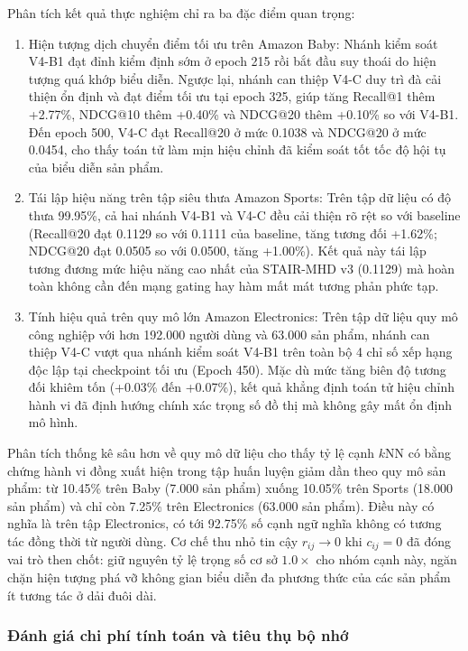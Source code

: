 Phân tích kết quả thực nghiệm chỉ ra ba đặc điểm quan trọng:
\begin{enumerate}[leftmargin=*]
    \item Hiện tượng dịch chuyển điểm tối ưu trên Amazon Baby: Nhánh kiểm soát V4-B1 đạt đỉnh kiểm định sớm ở epoch 215 rồi bắt đầu suy thoái do hiện tượng quá khớp biểu diễn. Ngược lại, nhánh can thiệp V4-C duy trì đà cải thiện ổn định và đạt điểm tối ưu tại epoch 325, giúp tăng Recall@1 thêm +2.77\%, NDCG@10 thêm +0.40\% và NDCG@20 thêm +0.10\% so với V4-B1. Đến epoch 500, V4-C đạt Recall@20 ở mức 0.1038 và NDCG@20 ở mức 0.0454, cho thấy toán tử làm mịn hiệu chỉnh đã kiểm soát tốt tốc độ hội tụ của biểu diễn sản phẩm.
    \item Tái lập hiệu năng trên tập siêu thưa Amazon Sports: Trên tập dữ liệu có độ thưa 99.95\%, cả hai nhánh V4-B1 và V4-C đều cải thiện rõ rệt so với baseline (Recall@20 đạt 0.1129 so với 0.1111 của baseline, tăng tương đối +1.62\%; NDCG@20 đạt 0.0505 so với 0.0500, tăng +1.00\%). Kết quả này tái lập tương đương mức hiệu năng cao nhất của STAIR-MHD v3 (0.1129) mà hoàn toàn không cần đến mạng gating hay hàm mất mát tương phản phức tạp.
    \item Tính hiệu quả trên quy mô lớn Amazon Electronics: Trên tập dữ liệu quy mô công nghiệp với hơn 192.000 người dùng và 63.000 sản phẩm, nhánh can thiệp V4-C vượt qua nhánh kiểm soát V4-B1 trên toàn bộ 4 chỉ số xếp hạng độc lập tại checkpoint tối ưu (Epoch 450). Mặc dù mức tăng biên độ tương đối khiêm tốn (+0.03\% đến +0.07\%), kết quả khẳng định toán tử hiệu chỉnh hành vi đã định hướng chính xác trọng số đồ thị mà không gây mất ổn định mô hình.
\end{enumerate}

Phân tích thống kê sâu hơn về quy mô dữ liệu cho thấy tỷ lệ cạnh $k\text{NN}$ có bằng chứng hành vi đồng xuất hiện trong tập huấn luyện giảm dần theo quy mô sản phẩm: từ 10.45\% trên Baby (7.000 sản phẩm) xuống 10.05\% trên Sports (18.000 sản phẩm) và chỉ còn 7.25\% trên Electronics (63.000 sản phẩm). Điều này có nghĩa là trên tập Electronics, có tới 92.75\% số cạnh ngữ nghĩa không có tương tác đồng thời từ người dùng. Cơ chế thu nhỏ tin cậy $r_{ij} \to 0$ khi $c_{ij} = 0$ đã đóng vai trò then chốt: giữ nguyên tỷ lệ trọng số cơ sở $1.0\times$ cho nhóm cạnh này, ngăn chặn hiện tượng phá vỡ không gian biểu diễn đa phương thức của các sản phẩm ít tương tác ở dải đuôi dài.

\subsubsection{Đánh giá chi phí tính toán và tiêu thụ bộ nhớ}

